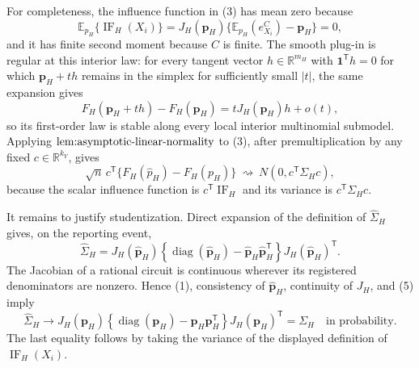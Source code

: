 For completeness, the influence function in (3) has mean zero because
\[
 \mathbb E_{p_H}\{\operatorname{IF}_H(X_i)\}
 =J_H(\mathbf p_H)\{\mathbb E_{p_H}(e_{X_i}^C)-\mathbf p_H\}=0,
\]
and it has finite second moment because \(C\) is finite.  The smooth plug-in is regular at this interior law: for every tangent vector \(h\in\mathbb R^{m_H}\) with \(\mathbf 1^{\mathsf T}h=0\) for which \(\mathbf p_H+t h\) remains in the simplex for sufficiently small \(|t|\), the same expansion gives
\[
 F_H(\mathbf p_H+t h)-F_H(\mathbf p_H)
 =tJ_H(\mathbf p_H)h+o(t),
\]
so its first-order law is stable along every local interior multinomial submodel.  Applying \(\textnormal{lem:asymptotic-linear-normality}\) to (3), after premultiplication by any fixed \(c\in\mathbb R^{k_Y}\), gives
\[
 \sqrt n\,c^{\mathsf T}\{F_H(\widehat p_H)-F_H(p_H)\}
 \ \rightsquigarrow\ 
 N\!\left(0,c^{\mathsf T}\Sigma_Hc\right), \tag{4}
\]
because the scalar influence function is \(c^{\mathsf T}\operatorname{IF}_H\) and its variance is \(c^{\mathsf T}\Sigma_Hc\).

It remains to justify studentization.  Direct expansion of the definition of \(\widehat\Sigma_H\) gives, on the reporting event,
\[
 \widehat\Sigma_H
 =J_H(\widehat{\mathbf p}_H)
 \left\{\operatorname{diag}(\widehat{\mathbf p}_H)
 -\widehat{\mathbf p}_H\widehat{\mathbf p}_H^{\mathsf T}\right\}
 J_H(\widehat{\mathbf p}_H)^{\mathsf T}. \tag{5}
\]
The Jacobian of a rational circuit is continuous wherever its registered denominators are nonzero.  Hence (1), consistency of \(\widehat{\mathbf p}_H\), continuity of \(J_H\), and (5) imply
\[
 \widehat\Sigma_H\longrightarrow
 J_H(\mathbf p_H)
 \left\{\operatorname{diag}(\mathbf p_H)
 -\mathbf p_H\mathbf p_H^{\mathsf T}\right\}
 J_H(\mathbf p_H)^{\mathsf T}
 =\Sigma_H
 \quad\text{in probability}. \tag{6}
\]
The last equality follows by taking the variance of the displayed definition of \(\operatorname{IF}_H(X_i)\).

